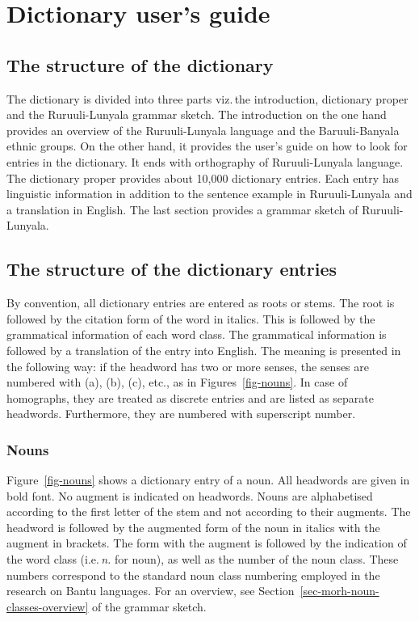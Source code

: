 \chapter{Dictionary user’s guide}\label{sec-dictionary-users-guide}

\largerpage[2]
\section{The structure of the dictionary}
The dictionary is divided into three parts viz.\,the introduction, dictionary proper and the Ru\-ruu\-li\hyp{}Lu\-nya\-la grammar sketch. 
The introduction on the one hand provides an overview of the Ru\-ruu\-li\hyp{}Lu\-nya\-la language and the Baruuli-Banyala ethnic groups. 
On the other hand, it provides the user’s guide on how to look for entries in the dictionary. It ends with orthography of Ru\-ruu\-li\hyp{}Lu\-nya\-la language. 
The dictionary proper provides about 10,000 dictionary entries. Each entry has linguistic information in addition to the sentence example in Ru\-ruu\-li\hyp{}Lu\-nya\-la and a translation in English. The last section provides a grammar sketch of Ru\-ruu\-li\hyp{}Lu\-nya\-la. 

\section{The structure of the dictionary entries}

By convention, all dictionary entries are entered as roots or stems. 
The root is followed by the citation form of the word in italics. 
This is followed by the grammatical information of each word class. 
The grammatical information is followed by a translation of the entry into English. 
The meaning is presented in the following way: 
if the headword has two or more senses, the senses are numbered with (a), (b), (c), etc., as in Figures~\ref{fig-nouns}. 
In case of homographs, they are treated as discrete entries and are listed as separate headwords. Furthermore, they are numbered with superscript number. 


\subsection{Nouns}

Figure~\ref{fig-nouns} shows a dictionary entry of a noun. 
All headwords are given in bold font. 
No augment is indicated on head\-words. Nouns are alphabetised according to the first letter of the stem and not according to their augments. 
The headword is followed by the augmented form of the noun in italics with the augment in brackets. 
The form with the augment is followed by the indication of the word class (i.e.\,\emph{n.} for noun), as well as the number of the noun class. 
These numbers correspond to the standard noun class numbering employed in the research on Bantu languages. For an overview, see Section~\ref{sec-morh-noun-classes-overview} of the grammar sketch.

